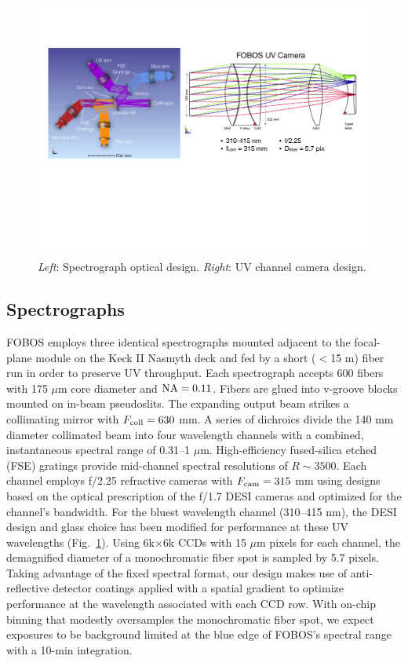 \documentclass[oneside,11pt]{amsart}
\begin{document}
\begin{figure}[h!]
\vskip -0.1in
\includegraphics[width=\textwidth]{figs/Spec_and_UVcam_v1.pdf}
\caption{\small {\it Left}: Spectrograph optical design. {\it Right}: UV channel camera design.}
\label{fig:spec}
\end{figure}

\subsection{Spectrographs}

FOBOS employs three identical spectrographs mounted adjacent to the focal-plane module on the Keck II Nasmyth deck and fed by a short ($<$15 m) fiber run in order to preserve UV throughput.  Each spectrograph accepts 600 fibers with 175 $\mu$m core diameter and ${\rm NA} = 0.11$.  Fibers are glued into v-groove blocks mounted on in-beam pseudoslits.  The expanding output beam strikes a collimating mirror with $F_{\rm coll} = 630$ mm. A series of dichroics divide the 140 mm diameter collimated beam into four wavelength channels with a combined, instantaneous spectral range of 0.31--1 $\mu$m. High-efficiency fused-silica etched (FSE) gratings \citep{ZeitnerFSE} provide mid-channel spectral resolutions of $R \sim 3500$.  Each channel employs f/2.25 refractive cameras with $F_{\rm cam} = 315$ mm using designs based on the optical prescription of the f/1.7 DESI cameras and optimized for the channel’s bandwidth.  For the bluest wavelength channel (310--415 nm), the DESI design and glass choice has been modified for performance at these UV wavelengths (Fig.~\ref{fig:spec}).  Using 6k$\times$6k CCDs with 15 $\mu$m pixels for each channel, the demagnified diameter of a monochromatic fiber spot is sampled by 5.7 pixels. Taking advantage of the fixed spectral format, our design makes use of anti-reflective detector coatings applied with a spatial gradient to optimize performance at the wavelength associated with each CCD row. With on-chip binning that modestly oversamples the monochromatic fiber spot, we expect exposures to be background limited at the blue edge of FOBOS's spectral range with a 10-min integration.
\end{document}
